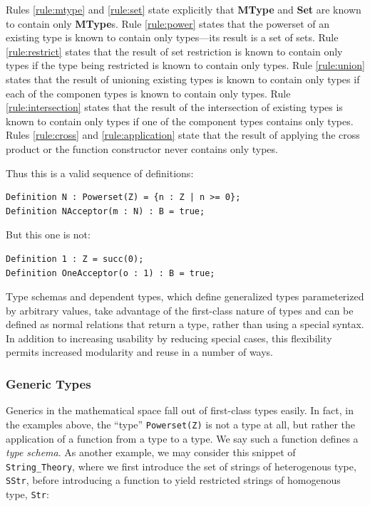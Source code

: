 Rules \ref{rule:mtype} and \ref{rule:set} state explicitly that \textbf{MType} and \textbf{Set} are known to contain only \textbf{MType}s.  Rule \ref{rule:power} states that the powerset of an existing type is known to contain only types---its result is a set of sets.  Rule \ref{rule:restrict} states that the result of set restriction is known to contain only types if the type being restricted is known to contain only types.  Rule \ref{rule:union} states that the result of unioning existing types is known to contain only types if each of the componen types is known to contain only types.  Rule \ref{rule:intersection} states that the result of the intersection of existing types is known to contain only types if one of the component types contains only types.  Rules \ref{rule:cross} and \ref{rule:application} state that the result of applying the cross product or the function constructor never contains only types.

Thus this is a valid sequence of definitions:

\begin{lstlisting}
Definition N : Powerset(Z) = {n : Z | n >= 0};
Definition NAcceptor(m : N) : B = true;
\end{lstlisting}

But this one is not:

\begin{lstlisting}
Definition 1 : Z = succ(0);
Definition OneAcceptor(o : 1) : B = true;
\end{lstlisting}

Type schemas and dependent types, which define generalized types parameterized by arbitrary values, take advantage of the first-class nature of types and can be defined as normal relations that return a type, rather than using a special syntax.  In addition to increasing usability by reducing special cases, this flexibility permits increased modularity and reuse in a number of ways.

		\subsubsection{Generic Types\label{genericTypes}}

Generics in the mathematical space fall out of first-class types easily.  In fact, in the examples above, the ``type'' \texttt{Powerset(Z)} is not a type at all, but rather the application of a function from a type to a type.  We say such a function defines a \emph{type schema}.  As another example, we may consider this snippet of \texttt{String\_Theory}, where we first introduce the set of strings of heterogenous type, \texttt{SStr}, before introducing a function to yield restricted strings of homogenous type, \texttt{Str}:

